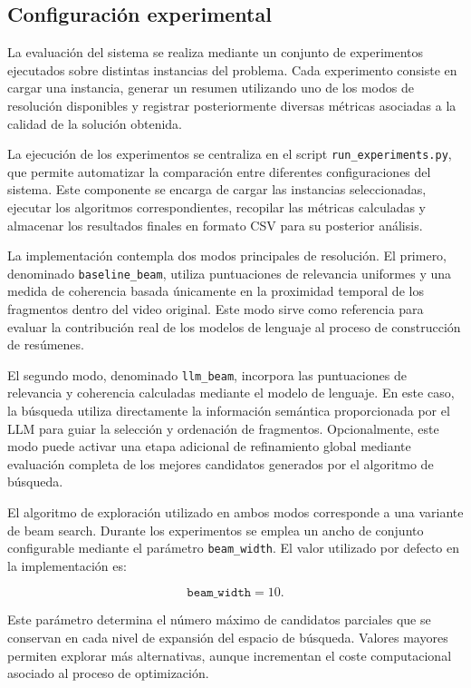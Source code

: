 \documentclass[12pt,a4paper]{article}
\begin{document}
\subsection{Configuración experimental}

La evaluación del sistema se realiza mediante un conjunto de experimentos ejecutados sobre distintas instancias del problema. Cada experimento consiste en cargar una instancia, generar un resumen utilizando uno de los modos de resolución disponibles y registrar posteriormente diversas métricas asociadas a la calidad de la solución obtenida.

La ejecución de los experimentos se centraliza en el script \texttt{run\_experiments.py}, que permite automatizar la comparación entre diferentes configuraciones del sistema. Este componente se encarga de cargar las instancias seleccionadas, ejecutar los algoritmos correspondientes, recopilar las métricas calculadas y almacenar los resultados finales en formato CSV para su posterior análisis.

La implementación contempla dos modos principales de resolución. El primero, denominado \texttt{baseline\_beam}, utiliza puntuaciones de relevancia uniformes y una medida de coherencia basada únicamente en la proximidad temporal de los fragmentos dentro del video original. Este modo sirve como referencia para evaluar la contribución real de los modelos de lenguaje al proceso de construcción de resúmenes.

El segundo modo, denominado \texttt{llm\_beam}, incorpora las puntuaciones de relevancia y coherencia calculadas mediante el modelo de lenguaje. En este caso, la búsqueda utiliza directamente la información semántica proporcionada por el LLM para guiar la selección y ordenación de fragmentos. Opcionalmente, este modo puede activar una etapa adicional de refinamiento global mediante evaluación completa de los mejores candidatos generados por el algoritmo de búsqueda.

El algoritmo de exploración utilizado en ambos modos corresponde a una variante de beam search. Durante los experimentos se emplea un ancho de conjunto configurable mediante el parámetro \texttt{beam\_width}. El valor utilizado por defecto en la implementación es:

\[
\texttt{beam\_width}=10.
\]

Este parámetro determina el número máximo de candidatos parciales que se conservan en cada nivel de expansión del espacio de búsqueda. Valores mayores permiten explorar más alternativas, aunque incrementan el coste computacional asociado al proceso de optimización.
\end{document}
